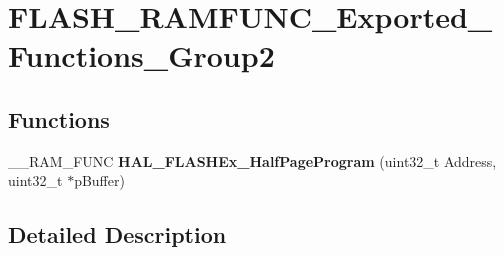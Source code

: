 \hypertarget{group___f_l_a_s_h___r_a_m_f_u_n_c___exported___functions___group2}{\section{F\-L\-A\-S\-H\-\_\-\-R\-A\-M\-F\-U\-N\-C\-\_\-\-Exported\-\_\-\-Functions\-\_\-\-Group2}
\label{group___f_l_a_s_h___r_a_m_f_u_n_c___exported___functions___group2}
}
\subsection*{Functions}
\begin{DoxyCompactItemize}
\item 
\hypertarget{group___f_l_a_s_h___r_a_m_f_u_n_c___exported___functions___group2_ga947dd02a820f7ee712f000bb2d85e208}{\-\_\-\-\_\-\-R\-A\-M\-\_\-\-F\-U\-N\-C {\bfseries H\-A\-L\-\_\-\-F\-L\-A\-S\-H\-Ex\-\_\-\-Half\-Page\-Program} (uint32\-\_\-t Address, uint32\-\_\-t $\ast$p\-Buffer)}\label{group___f_l_a_s_h___r_a_m_f_u_n_c___exported___functions___group2_ga947dd02a820f7ee712f000bb2d85e208}

\end{DoxyCompactItemize}


\subsection{Detailed Description}
